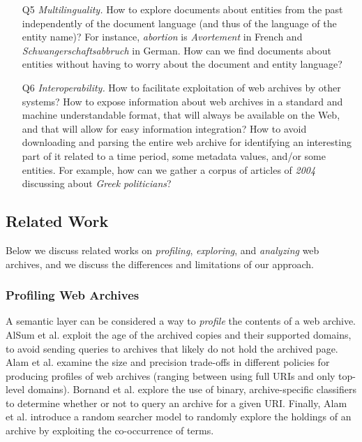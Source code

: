 \documentclass[twocolumn]{svjour3}
\begin{document}
\begin{itemize}
\item[Q5]   {\em Multilinguality.} How to explore documents about
            entities from the past
            independently of the document language (and thus of the language
            of the entity name)? For instance,
            {\em abortion} is {\em Avortement} in French and
            {\em Sch\-wan\-ger\-schaftsabbruch} in German.
            How can we find documents about entities without having to worry
            about the document and entity language?
\item[Q6]   {\em Interoperability.}
            How to facilitate exploitation of web archives by other systems?
            How to expose information about web archives
            in a standard and machine understandable format,
            that will always be available on the Web,
            and that will allow for easy information integration?
            How to avoid downloading and parsing the entire web archive for
            identifying an interesting part of it related to a time period,
            some metadata values, and/or some entities. For example, how can we gather a corpus
            of articles of {\em 2004} discussing about {\em Greek politicians}?
\end{itemize}



\subsection{Related Work}
\label{rw}

Below we discuss related works on
{\em profiling}, {\em exploring}, and {\em analyzing} web archives,
and we discuss the differences and limitations of our approach.

\subsubsection{Profiling Web Archives}
A semantic layer can be considered a way to {\em profile}
the contents of a web archive.
AlSum et al. \cite{alsum2014profiling} exploit the age of the archived copies
and their supported domains,
to avoid sending queries to archives that likely do not hold the archived page.
Alam et al. \cite{alam2015web} examine the size and precision
trade-offs in different policies for producing profiles of web archives
(ranging between using full URIs and only top-level domains).
Bornand et al. \cite{bornand2016routing}
explore the use of binary, archive-specific classifiers
to determine whether or not to query an archive for a given URI.
Finally, Alam et al. \cite{alam2016web}
introduce a random searcher model to randomly explore the holdings of an archive
by exploiting the co-occurrence of terms.
\end{document}
